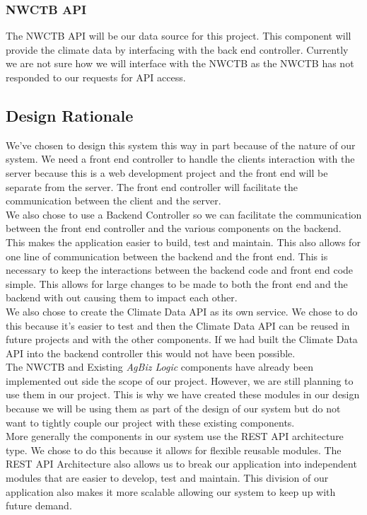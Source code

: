 \documentclass[onecolumn, draftclsnofoot,10pt, compsoc]{article}
\begin{document}
		\subsubsection{NWCTB API}
			The NWCTB API will be our data source for this project. This component will provide the climate data by interfacing with the back end controller. Currently we are not sure how we will interface with the NWCTB as the NWCTB has not responded to our requests for API access.\\

	\subsection{Design Rationale}
		We've chosen to design this system this way in part because of the nature of our system. We need a front end controller to handle the clients interaction with the server because this is a web development project and the front end will be separate from the server. The front end controller will facilitate the communication between the client and the server.\\
		We also chose to use a Backend Controller so we can facilitate the communication between the front end controller and the various components on the backend. This makes the application easier to build, test and maintain. This also allows for one line of communication between the backend and the front end. This is necessary to keep the interactions between the backend code and front end code simple. This allows for large changes to be made to both the front end and the backend with out causing them to impact each other.\\
		We also chose to create the Climate Data API as its own service. We chose to do this because it's easier to test and then the Climate Data API can be reused in future projects and with the other components. If we had built the Climate Data API into the backend controller this would not have been possible.\\
		The NWCTB and Existing \textit{AgBiz Logic} components have already been implemented out side the scope of our project. However, we are still planning to use them in our project. This is why we have created these modules in our design because we will be using them as part of the design of our system but do not want to tightly couple our project with these existing components.\\
		More generally the components in our system use the REST API architecture type. We chose to do this because it allows for flexible reusable modules. The REST API Architecture also allows us to break our application into independent modules that are easier to develop, test and maintain. This division of our application also makes it more scalable allowing our system to keep up with future demand.\\
\end{document}
